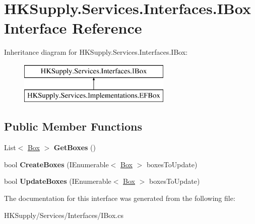 \hypertarget{interface_h_k_supply_1_1_services_1_1_interfaces_1_1_i_box}{}\section{H\+K\+Supply.\+Services.\+Interfaces.\+I\+Box Interface Reference}
\label{interface_h_k_supply_1_1_services_1_1_interfaces_1_1_i_box}
Inheritance diagram for H\+K\+Supply.\+Services.\+Interfaces.\+I\+Box\+:\begin{figure}[H]
\begin{center}
\leavevmode
\includegraphics[height=2.000000cm]{interface_h_k_supply_1_1_services_1_1_interfaces_1_1_i_box}
\end{center}
\end{figure}
\subsection*{Public Member Functions}
\begin{DoxyCompactItemize}
\item 
\mbox{\label{interface_h_k_supply_1_1_services_1_1_interfaces_1_1_i_box_abe6a1954fb7bee8607c127f2d0012a20}} 
List$<$ \mbox{\hyperlink{class_h_k_supply_1_1_models_1_1_supply_1_1_box}{Box}} $>$ {\bfseries Get\+Boxes} ()
\item 
\mbox{\label{interface_h_k_supply_1_1_services_1_1_interfaces_1_1_i_box_af39b2d9e4210ec8bd0651800b59d66fb}} 
bool {\bfseries Create\+Boxes} (I\+Enumerable$<$ \mbox{\hyperlink{class_h_k_supply_1_1_models_1_1_supply_1_1_box}{Box}} $>$ boxes\+To\+Update)
\item 
\mbox{\label{interface_h_k_supply_1_1_services_1_1_interfaces_1_1_i_box_a44aafc2aa9d036511d738f86ae6b3657}} 
bool {\bfseries Update\+Boxes} (I\+Enumerable$<$ \mbox{\hyperlink{class_h_k_supply_1_1_models_1_1_supply_1_1_box}{Box}} $>$ boxes\+To\+Update)
\end{DoxyCompactItemize}


The documentation for this interface was generated from the following file\+:\begin{DoxyCompactItemize}
\item 
H\+K\+Supply/\+Services/\+Interfaces/I\+Box.\+cs\end{DoxyCompactItemize}
